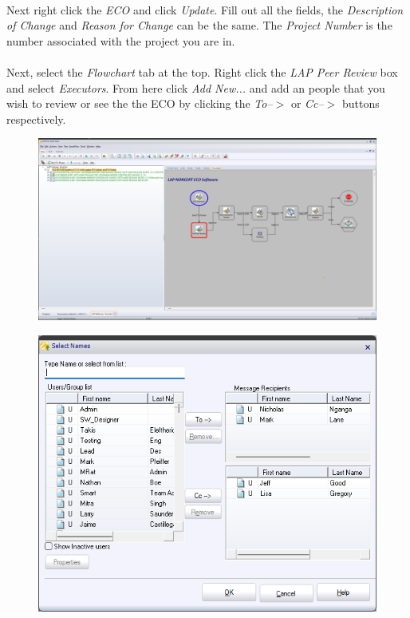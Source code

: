 \documentclass[10pt]{article}
\begin{document}
                \paragraph{}Next right click the \emph{ECO} and click \emph{Update}. Fill out all the fields, the \emph{Description of Change} and \emph{Reason for Change} can be the same. The \emph{Project Number} is the number associated with the project you are in.
                \paragraph{}Next, select the \emph{Flowchart} tab at the top. Right click the \emph{LAP Peer Review} box and select \emph{Executors}. From here click \emph{Add New...} and add an people that you wish to review or see the the ECO by clicking the \emph{To--$>$} or \emph{Cc--$>$} buttons respectively.
                \begin{figure}[H]
                    \centerline{\includegraphics[width=\textwidth]{References/ST ECO Flowchart.png}}
                \end{figure}
                \begin{figure}[H]
                    \centerline{\includegraphics[width=\textwidth]{References/ST ECO Select Names.png}}
                \end{figure}
\end{document}

